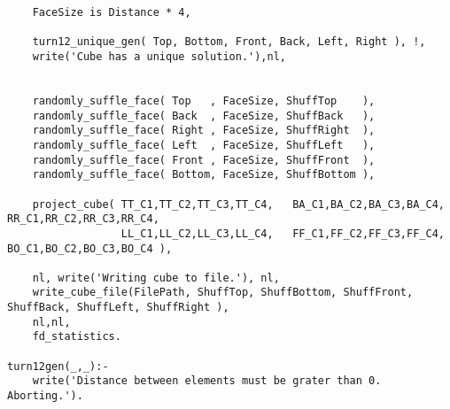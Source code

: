 \begin{lstlisting}
	FaceSize is Distance * 4,
	
	turn12_unique_gen( Top, Bottom, Front, Back, Left, Right ), !,
	write('Cube has a unique solution.'),nl,
	

	randomly_suffle_face( Top   , FaceSize, ShuffTop    ),
	randomly_suffle_face( Back  , FaceSize, ShuffBack   ),
	randomly_suffle_face( Right , FaceSize, ShuffRight  ),
	randomly_suffle_face( Left  , FaceSize, ShuffLeft   ),
	randomly_suffle_face( Front , FaceSize, ShuffFront  ),
	randomly_suffle_face( Bottom, FaceSize, ShuffBottom ),
	
	project_cube( TT_C1,TT_C2,TT_C3,TT_C4,   BA_C1,BA_C2,BA_C3,BA_C4,   RR_C1,RR_C2,RR_C3,RR_C4,
                  LL_C1,LL_C2,LL_C3,LL_C4,   FF_C1,FF_C2,FF_C3,FF_C4,   BO_C1,BO_C2,BO_C3,BO_C4 ),
				  
	nl, write('Writing cube to file.'), nl,
	write_cube_file(FilePath, ShuffTop, ShuffBottom, ShuffFront, ShuffBack, ShuffLeft, ShuffRight ),
	nl,nl,
	fd_statistics.

turn12gen(_,_):-
	write('Distance between elements must be grater than 0. Aborting.').
	
\end{lstlisting}